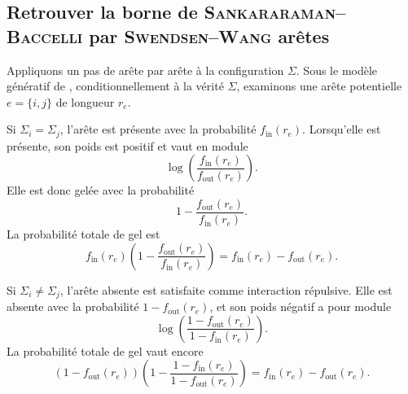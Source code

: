 
\subsection{Retrouver la borne de \textsc{Sankararaman--Baccelli} par \textsc{Swendsen--Wang} arêtes}
\label{sec:chapII_SB_edges}

Appliquons un pas de \SW{} arête par arête à la configuration $\Sigma$. Sous le modèle génératif de \SB{}, conditionnellement à la vérité $\Sigma$, examinons une arête potentielle $e=\{i,j\}$ de longueur $r_e$.

Si $\Sigma_i=\Sigma_j$, l'arête est présente avec la probabilité $f_{\mathrm{in}}(r_e)$. Lorsqu'elle est présente, son poids est positif et vaut en module
\[
    \log\left(\frac{f_{\mathrm{in}}(r_e)}{f_{\mathrm{out}}(r_e)}\right).
\]
Elle est donc gelée avec la probabilité
\[
    1-\frac{f_{\mathrm{out}}(r_e)}{f_{\mathrm{in}}(r_e)}.
\]
La probabilité totale de gel est
\begin{equation}
    f_{\mathrm{in}}(r_e)
    \left(1-\frac{f_{\mathrm{out}}(r_e)}{f_{\mathrm{in}}(r_e)}\right)
    =
    f_{\mathrm{in}}(r_e)-f_{\mathrm{out}}(r_e).
    \label{eq:chapII_SB_edge_same}
\end{equation}

Si $\Sigma_i\neq\Sigma_j$, l'arête absente est satisfaite comme interaction répulsive. Elle est absente avec la probabilité $1-f_{\mathrm{out}}(r_e)$, et son poids négatif a pour module
\[
    \log\left(\frac{1-f_{\mathrm{out}}(r_e)}{1-f_{\mathrm{in}}(r_e)}\right).
\]
La probabilité totale de gel vaut encore
\begin{equation}
    \left(1-f_{\mathrm{out}}(r_e)\right)
    \left(1-\frac{1-f_{\mathrm{in}}(r_e)}{1-f_{\mathrm{out}}(r_e)}\right)
    =
    f_{\mathrm{in}}(r_e)-f_{\mathrm{out}}(r_e).
    \label{eq:chapII_SB_edge_diff}
\end{equation}

